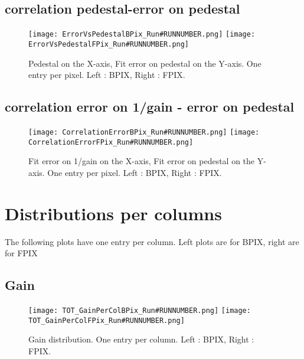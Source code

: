 \documentclass[a4paper,10pt]{article}
\begin{document}
\subsection{correlation pedestal-error on pedestal}

\begin{figure}[htp]
 \centering
\subfigure
 {\texttt{[image: ErrorVsPedestalBPix\_Run\#RUNNUMBER.png]}}
\subfigure
 {\texttt{[image: ErrorVsPedestalFPix\_Run\#RUNNUMBER.png]}}
\caption{Pedestal on the X-axis, Fit error on pedestal on the Y-axis. One entry per pixel. Left : BPIX, Right : FPIX.}
\end{figure}



\subsection{correlation error on 1/gain - error on pedestal}

\begin{figure}[htp]
 \centering
\subfigure
 {\texttt{[image: CorrelationErrorBPix\_Run\#RUNNUMBER.png]}}
\subfigure
 {\texttt{[image: CorrelationErrorFPix\_Run\#RUNNUMBER.png]}}
\caption{Fit error on 1/gain on the X-axis, Fit error on pedestal on the Y-axis. One entry per pixel. Left : BPIX, Right : FPIX.}
\end{figure}


\pagebreak









\section{Distributions per columns\label{sec:col}}

The following plots have one entry per column. Left plots are for BPIX, right are for FPIX

\subsection{Gain}

\begin{figure}[htp]
 \centering
\subfigure
 {\texttt{[image: TOT\_GainPerColBPix\_Run\#RUNNUMBER.png]}}
\subfigure
 {\texttt{[image: TOT\_GainPerColFPix\_Run\#RUNNUMBER.png]}}
\caption{Gain distribution. One entry per column. Left : BPIX, Right : FPIX.}
\end{figure}
\end{document}
